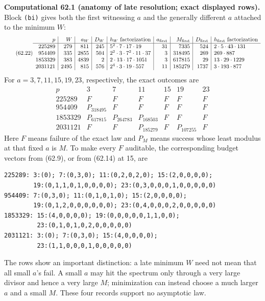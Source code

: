 \documentclass[10pt,reqno]{amsart}
\theoremstyle{definition}
\newcommand{\1}{\mathbf 1}
\begin{document}
\medskip\noindent\textbf{Computational 62.1 (anatomy of late resolution;
exact displayed rows).}
Block \texttt{(bi)} gives both the first witnessing $a$ and the generally
different $a$ attached to the minimum $W$:
\begingroup\scriptsize
\begin{equation}\tag{62.22}
\begin{array}{r|r|r|r|l|r|r|r|l}
p&W&a_W&D_W&h_W\text{ factorization}&a_{\rm first}&M_{\rm first}&D_{\rm first}&
 h_{\rm first}\text{ factorization}\\ \hline
225289&279&811&245&5^2\cdot7\cdot17\cdot19&31&7335&524&2\cdot5\cdot43\cdot131\\
954409&335&2855&504&2^2\cdot3\cdot7^2\cdot11\cdot37&3&318495&269&269\cdot887\\
1853329&383&4839&2&2\cdot13\cdot17\cdot1051&3&617815&29&13\cdot29\cdot1229\\
2031121&2495&815&576&2^4\cdot3\cdot19\cdot557&11&185279&1737&3\cdot193\cdot877
\end{array}
\end{equation}
\endgroup
For $a=3,7,11,15,19,23$, respectively, the exact outcomes are
\begin{equation}\tag{62.23}
\begin{array}{r|llllll}
p&3&7&11&15&19&23\\ \hline
225289&F&F&F&F&F&F\\
954409&P_{318495}&F&F&F&F&F\\
1853329&P_{617815}&P_{264783}&P_{168503}&F&F&F\\
2031121&F&F&P_{185279}&F&P_{107255}&F
\end{array}
\end{equation}
Here $F$ means failure of the exact law and $P_M$ means success whose least
modulus at that fixed $a$ is $M$.  To make every $F$ auditable, the
corresponding budget vectors from (62.9), or from (62.14) at 15, are
\begingroup\scriptsize
\begin{verbatim}
225289: 3:(0); 7:(0,3,0); 11:(0,2,0,2,0); 15:(2,0,0,0,0);
        19:(0,1,1,0,1,0,0,0,0); 23:(0,3,0,0,0,1,0,0,0,0,0)
954409: 7:(0,3,0); 11:(0,1,0,1,0); 15:(2,0,0,0,0);
        19:(0,1,2,0,0,0,0,0,0); 23:(0,4,0,0,0,2,0,0,0,0,0)
1853329: 15:(4,0,0,0,0); 19:(0,0,0,0,0,1,1,0,0);
         23:(0,1,0,1,0,2,0,0,0,0,0)
2031121: 3:(0); 7:(0,3,0); 15:(4,0,0,0,0);
         23:(1,1,0,0,0,1,0,0,0,0,0)
\end{verbatim}
\endgroup
The rows show an important distinction: a late minimum $W$ need not mean
that all small $a$'s fail.  A small $a$ may hit the spectrum only through a
very large divisor and hence a very large $M$; minimization can instead
choose a much larger $a$ and a small $M$.  These four records support no
asymptotic law.
\end{document}
